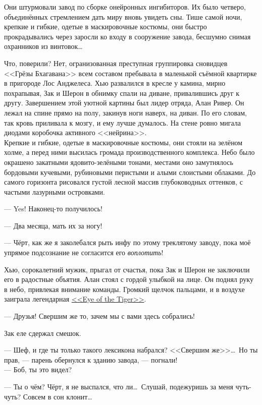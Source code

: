 \documentclass[openany, oneside]{book}
\begin{document}
Они штурмовали завод по сборке онейронных ингибиторов. Их было четверо, объединённых стремлением дать миру вновь увидеть сны. Тише самой ночи, крепкие и гибкие, одетые в маскировочные костюмы, они быстро прокрадывались через заросли ко входу в сооружение завода, бесшумно снимая охранников из винтовок\dots

Что, поверили? Нет, огранизованная преступная группировка сновидцев <<Грёзы Бхагавана>> всем составом пребывала в маленькой съёмной квартирке в пригороде Лос Анджелеса. Хью развалился в кресле у камина, мирно похрапывая, Зак и Шерон в обнимку спали на диване, привалившись друг к другу. Завершением этой уютной картины был лидер отряда, Алан Ривер. Он лежал на спине прямо на полу, закинув ноги наверх, на диван. По его словам, так кровь приливала к мозгу, и ему лучше думалось. На стене ровно мигала диодами коробочка активного <<нейрина>>.\\

Крепкие и гибкие, одетые в маскировочные костюмы, они стояли на зелёном холме, а перед ними высилась громада производственного комплекса. Небо было окрашено закатными ядовито-зелёными тонами, местами оно замутнялось бордовыми кучевыми, рубиновыми перистыми и алыми слоистыми облаками. До самого горизонта рисовался густой лесной массив глубоководных оттенков, с частыми лазурными островками.

--- Yes! Наконец-то получилось!

--- Два месяца, мать их за ногу!

--- Чёрт, как же я заколебался рыть инфу по этому треклятому заводу, пока моё упрямое подсознание не согласится его \textit{воплотить}!

Хью, сорокалетний мужик, прыгал от счастья, пока Зак и Шерон не заключили его в радостные объятия. Алан стоял с гордой улыбкой на лице. Он поднял руку в небо, привлекая внимание команды. Громкий щелчок пальцами, и в воздухе заиграла легендарная \href{https://www.youtube.com/watch?v=btPJPFnesV4}{<<Eye of the Tiger>>}.

--- Друзья! Свершим же то, зачем мы с вами здесь собрались!

Зак еле сдержал смешок.

--- Шеф, и где ты только такого лексикона набрался? <<Свершим же>>\dots \ Но ты прав, --- парень обернулся к зданию завода, --- погнали!\\

--- Боб, ты это видел?

--- Ты о чём? Чёрт, я не выспался, что ли\dots \ Слушай, подежуришь за меня чуть-чуть? Совсем в сон клонит\dots
\end{document}
